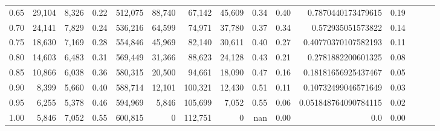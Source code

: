 \begin{tabular}{rrrrrrrrrrrrrrr}
0.65 &  29,104 &  8,326 &  0.22 &  512,075 &   88,740 &   67,142 &   45,609 &  0.34 &  0.40 &    0.7870440173479615 &      0.19 \\
0.70 &  24,141 &  7,829 &  0.24 &  536,216 &   64,599 &   74,971 &   37,780 &  0.37 &  0.34 &     0.572935051573822 &      0.14 \\
0.75 &  18,630 &  7,169 &  0.28 &  554,846 &   45,969 &   82,140 &   30,611 &  0.40 &  0.27 &   0.40770370107582193 &      0.11 \\
0.80 &  14,603 &  6,483 &  0.31 &  569,449 &   31,366 &   88,623 &   24,128 &  0.43 &  0.21 &    0.2781882200601325 &      0.08 \\
0.85 &  10,866 &  6,038 &  0.36 &  580,315 &   20,500 &   94,661 &   18,090 &  0.47 &  0.16 &   0.18181656925437467 &      0.05 \\
0.90 &   8,399 &  5,660 &  0.40 &  588,714 &   12,101 &  100,321 &   12,430 &  0.51 &  0.11 &   0.10732499046571649 &      0.03 \\
0.95 &   6,255 &  5,378 &  0.46 &  594,969 &    5,846 &  105,699 &    7,052 &  0.55 &  0.06 &  0.051848764090784115 &      0.02 \\
1.00 &   5,846 &  7,052 &  0.55 &  600,815 &        0 &  112,751 &        0 &   nan &  0.00 &                   0.0 &      0.00 \\
\bottomrule
\end{tabular}
